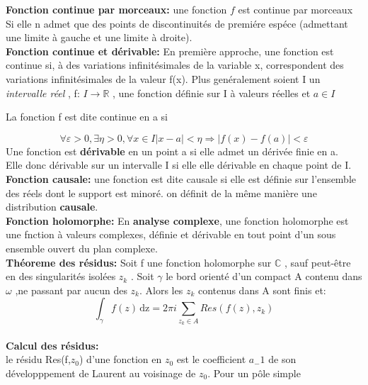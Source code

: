 \documentclass[12pt,a4paper]{report}
\begin{document}
\textbf{Fonction continue par morceaux:}  une fonction $f$ est continue par morceaux Si elle n admet que des points de discontinuités de
 premiére espéce (admettant une limite à gauche et une limite à droite).\\
 
\textbf{Fonction continue et d\'erivable:} En première approche, une fonction est continue si, à des variations infinitésimales de la variable x, correspondent des variations infinitésimales de la valeur f(x).
Plus genéralement soient I un \textit{intervalle réel} , f:  $I \rightarrow \mathbb{R}$ , une fonction définie sur I à valeurs réelles et $\mathit{a\in I}$

La fonction f est dite continue en a si 

\[\forall \varepsilon >0  , \exists \eta  >0, \forall x \in I   {\lvert x-a  \rvert <\eta}  \Rightarrow {\lvert f(x)-f(a)\rvert}  <\varepsilon\]
Une fonction est \textbf{d\'erivable} en un point a si elle admet un dérivée finie en a.\\
 Elle donc dérivable sur un intervalle I si elle elle dérivable en chaque point de I.\\

\textbf{Fonction causale:} une fonction est dite causale si elle est d\'efinie  sur l'ensemble des réels dont le support est minoré. on définit de la m\^eme  manière une distribution \textbf{causale}.\\

 \textbf{Fonction holomorphe:} En \textbf{analyse complexe}, une fonction holomorphe est une fnction à valeurs complexes, définie et dérivable en tout point d'un sous ensemble ouvert du plan complexe.\\
 
 \textbf{Th\'eoreme des r\'esidus:}
 Soit f une fonction holomorphe sur $\mathbb{C}$ , sauf peut-être en des singularités isolées $z_k$ . Soit $\gamma$ le bord orienté d'un compact A contenu dans $\omega$ ,ne passant par aucun des $z_k$. Alors les $z_k$ contenus dans A sont finis et:\\
\begin{displaymath}
\int_{\gamma}f(z)\,\mathrm{dz} = 2 \pi i \sum_{z_k \in A}Res(f(z),z_k)
\end{displaymath}
\\

\textbf{Calcul des résidus:}\\
le résidu Res(f,$z_0$) d'une fonction en $z_0$ est le coefficient $a_-1$ de son développpement de Laurent au voisinage de $z_0$. Pour un p\^ole simple \\
\end{document}
